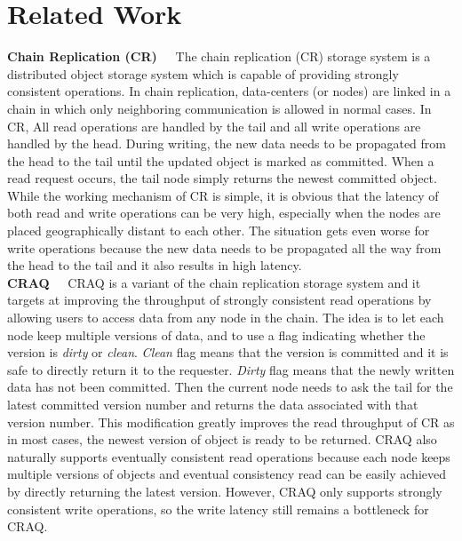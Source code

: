 \section{Related Work}

{\noindent \bf Chain Replication (CR)\ \ } The chain replication (CR) storage system is a distributed object storage system which is capable of providing strongly consistent operations. In chain replication, data-centers (or nodes) are linked in a chain in which only neighboring communication is allowed in normal cases. In CR, All read operations are handled by the tail and all write operations are handled by the head. During writing, the new data needs to be propagated from the head to the tail until the updated object is marked as committed. When a read request occurs, the tail node simply returns the newest committed object. While the working mechanism of CR is simple, it is obvious that the latency of both read and write operations can be very high, especially when the nodes are placed geographically distant to each other. The situation gets even worse for write operations because the new data needs to be propagated all the way from the head to the tail and it also results in high latency. \\

{\noindent \bf CRAQ\ \ } CRAQ\cite{terrace2009object} is a variant of the chain replication storage system and it targets at improving the throughput of strongly consistent read operations by allowing users to access data from any node in the chain. The idea is to let each node keep multiple versions of data, and to use a flag indicating whether the version is {\it dirty} or {\it clean}. {\it Clean} flag means that the version is committed and it is safe to directly return it to the requester. {\it Dirty} flag means that the newly written data has not been committed. Then the current node needs to ask the tail for the latest committed version number and returns the data associated with that version number. This modification greatly improves the read throughput of CR as in most cases, the newest version of object is ready to be returned. CRAQ also naturally supports eventually consistent read operations because each node keeps multiple versions of objects and eventual consistency read can be easily achieved by directly returning the latest version. However, CRAQ only supports strongly consistent write operations, so the write latency still remains a bottleneck for CRAQ. \\

